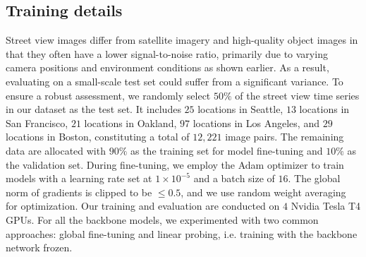 \documentclass[letterpaper]{article} %
\begin{document}
\subsection{Training details}
Street view images differ from satellite imagery and high-quality object images in that they often have a lower signal-to-noise ratio, primarily due to varying camera positions and environment conditions as shown earlier. As a result, evaluating on a small-scale test set could suffer from a significant variance. To ensure a robust assessment, we randomly select $50\%$ of the street view time series in our dataset as the test set. It includes $25$ locations in Seattle, $13$ locations in San Francisco, $21$ locations in Oakland, $97$ locations in Los Angeles, and $29$ locations in Boston, constituting a total of $12,221$ image pairs. The remaining data are allocated with $90\%$ as the training set for model fine-tuning and $10\%$ as the validation set.
During fine-tuning, we employ the Adam optimizer to train models with a learning rate set at $1 \times 10^{-5}$ and a batch size of $16$. The global norm of gradients is clipped to be $\leq 0.5$, and we use random weight averaging for optimization. Our training and evaluation are conducted on $4$ Nvidia Tesla T4 GPUs. For all the backbone models, we experimented with two common approaches: global fine-tuning and linear probing, i.e. training with the backbone network frozen.
\end{document}
